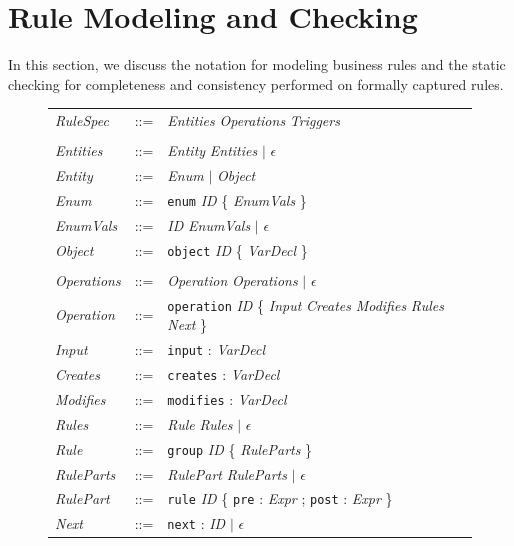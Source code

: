
\newcommand{\term}{\textit}
\newcommand{\lit}{\texttt}

\section{Rule Modeling and Checking}
\label{sec:model}

In this section, we discuss the notation for modeling business rules and the
static checking for completeness and consistency performed on formally captured
rules.

\begin{figure}[t]
\centering
{\footnotesize
\tabcolsep=3pt
\begin{tabular}{lll}
\term{RuleSpec} & ::= & \term{Entities} \term{Operations} \term{Triggers} \\
\\
\term{Entities} & ::= & \term{Entity} \term{Entities} $|$ $\epsilon$ \\
\term{Entity} & ::= & \term{Enum} $|$ \term{Object} \\
\term{Enum} & ::= & \lit{enum} \term{ID} \{ \term{EnumVals} \} \\
\term{EnumVals} & ::= & \term{ID} \term{EnumVals} $|$ $\epsilon$ \\
\term{Object} & ::= & \lit{object} \term{ID} \{ \term{VarDecl} \} \\
\\
\term{Operations} & ::= & \term{Operation} \term{Operations} $|$ $\epsilon$ \\
\term{Operation} & ::= & \lit{operation} \term{ID} \{ \term{Input}
\term{Creates} \term{Modifies} \term{Rules} \term{Next} \} \\
\term{Input} & ::= & \lit{input} : \term{VarDecl} \\
\term{Creates} & ::= & \lit{creates} : \term{VarDecl} \\
\term{Modifies} & ::= & \lit{modifies} : \term{VarDecl} \\
\term{Rules} & ::= & \term{Rule} \term{Rules} $|$ $\epsilon$ \\
\term{Rule} & ::= & \lit{group} \term{ID} \{ \term{RuleParts} \} \\
\term{RuleParts} & ::= & \term{RulePart} \term{RuleParts} $|$ $\epsilon$ \\
\term{RulePart} & ::= & \lit{rule} \term{ID} \{ \lit{pre} : \term{Expr} ;
\lit{post} : \term{Expr} \} \\
\term{Next} & ::= & \lit{next} : \term{ID} $|$ $\epsilon$ \\

\end{tabular}}
\end{figure}
